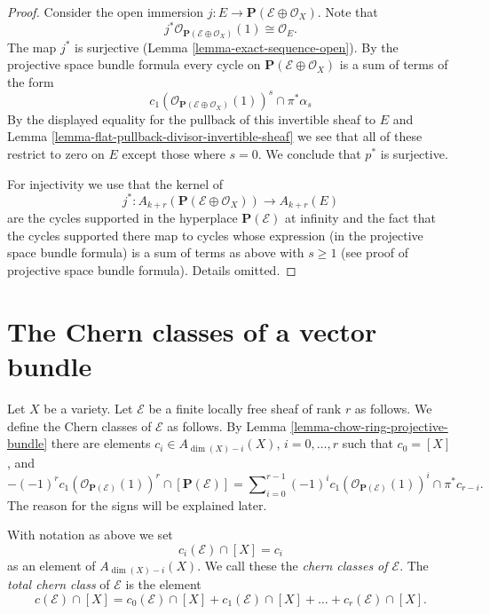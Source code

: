 \begin{proof}
Consider the open immersion
$j : E \to \mathbf{P}(\mathcal{E} \oplus \mathcal{O}_X)$.
Note that 
$$
j^*\mathcal{O}_{\mathbf{P}(\mathcal{E} \oplus \mathcal{O}_X)}(1)
\cong \mathcal{O}_E.
$$
The map $j^*$ is surjective (Lemma \ref{lemma-exact-sequence-open}).
By the projective space bundle formula every
cycle on $\mathbf{P}(\mathcal{E} \oplus \mathcal{O}_X)$ is a
sum of terms of the form 
$$
c_1(\mathcal{O}_{\mathbf{P}(\mathcal{E} \oplus \mathcal{O}_X)}(1))^s
\cap
\pi^*\alpha_s
$$
By the displayed equality for the pullback of this invertible sheaf
to $E$ and Lemma \ref{lemma-flat-pullback-divisor-invertible-sheaf}
we see that all of these restrict to zero on $E$ except those where
$s = 0$. We conclude that $p^*$ is surjective.

\medskip\noindent
For injectivity we use that the kernel of
$$
j^* :
A_{k + r}(\mathbf{P}(\mathcal{E} \oplus \mathcal{O}_X))
\longrightarrow
A_{k + r}(E)
$$
are the cycles supported in the hyperplace $\mathbf{P}(\mathcal{E})$
at infinity and the fact that the cycles supported there map to cycles
whose expression (in the projective space bundle formula) is a sum of
terms as above with $s \geq 1$ (see proof of projective space bundle
formula). Details omitted.
\end{proof}








\section{The Chern classes of a vector bundle}
\label{section-chern-classes-vector-bundles}

\noindent
Let $X$ be a variety. Let $\mathcal{E}$ be a finite locally free sheaf
of rank $r$ as follows. We define the Chern classes of $\mathcal{E}$
as follows. By Lemma \ref{lemma-chow-ring-projective-bundle} there are
elements $c_i \in A_{\dim(X) - i}(X)$, $i=0, \ldots, r$
such that $c_0 = [X]$, and
\begin{equation}
\label{equation-chern-classes}
-(-1)^r c_1(\mathcal{O}_{\mathbf{P}(\mathcal{E})}(1))^r \cap
[\mathbf{P}(\mathcal{E})]
=
\sum\nolimits_{i = 0}^{r - 1}
(-1)^i c_1(\mathcal{O}_{\mathbf{P}(\mathcal{E})}(1))^i \cap \pi^*c_{r - i}.
\end{equation}
The reason for the signs will be explained later.

\begin{definition}
\label{definition-chern-classes}
With notation as above we set
$$
c_i(\mathcal{E}) \cap [X] = c_i
$$
as an element of $A_{\dim(X) - i}(X)$.
We call these the {\it chern classes of $\mathcal{E}$}.
The {\it total chern class} of 
${\mathcal E}$ is the element
$$
c({\mathcal E}) \cap [X] = 
c_0({\mathcal E}) \cap [X] + c_1({\mathcal E}) \cap [X] + \ldots
+ c_r({\mathcal E}) \cap [X].
$$
\end{definition}

